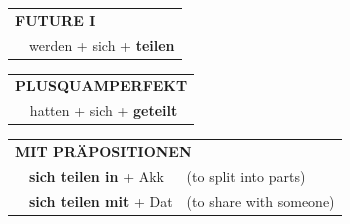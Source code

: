 \documentclass[10pt,a4paper]{revtex4-2}
\begin{document}
\begin{verbbox-dat}
\begin{tabular}{rl}
    \multicolumn{2}{l}{\textbf{FUTURE I} }\\
    &werden + sich + \textbf{teilen}\\
 
  \end{tabular}
\hfill
   \begin{tabular}{rl}
      \multicolumn{2}{l}{\textbf{PLUSQUAMPERFEKT}}\\
    &hatten + sich + \textbf{geteilt}\\
  \end{tabular}
  
\vspace{10pt}

   \begin{tabular}{lll}
      \multicolumn{3}{l}{\textbf{MIT PRÄPOSITIONEN}}\\
& \textbf{sich teilen in} + Akk & (to split into parts)\\
& \textbf{sich teilen mit} + Dat & (to share with someone)
  \end{tabular}


  \vspace{-5pt}

\end{verbbox-dat}
\end{document}
